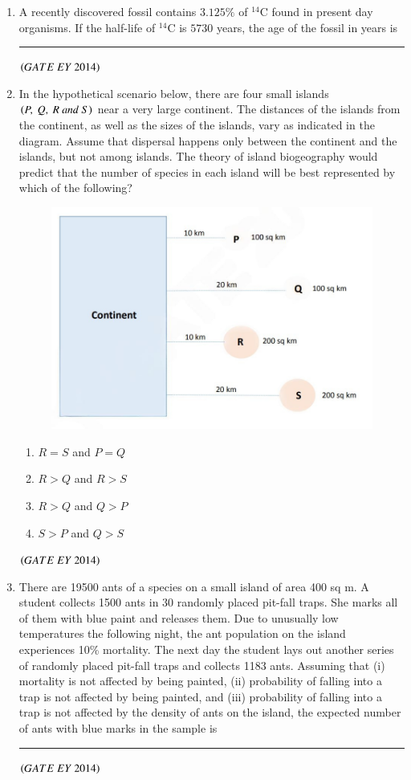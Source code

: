 \documentclass[journal]{IEEEtran}
\numberwithin{equation}{enumi}
\numberwithin{figure}{enumi}
\begin{document}
\begin{enumerate}
    \item A recently discovered fossil contains $3.125\%$ of $^{14}$C found in present day organisms. If the half-life of $^{14}$C is $5730$ years, the age of the fossil in years is \rule{3cm}{0.15mm}
    \hfill{$\brak{ GATE\ EY\ 2014}$}
    \bigskip
    
    \item In the hypothetical scenario below, there are four small islands $\left(P,\ Q,\ R\ and\ S\right)$ near a very large continent. The distances of the islands from the continent, as well as the sizes of the islands, vary as indicated in the diagram. Assume that dispersal happens only between the continent and the islands, but not among islands. The theory of island biogeography would predict that the number of species in each island will be best represented by which of the following?
    \begin{figure}[H]
    \centering
    \includegraphics[width=0.7\columnwidth]{figs/14.png}
    \caption{}
    \label{fig:14}
   \end{figure}
    \begin{multicols}{2}
    \begin{enumerate}
        \item $R = S$ and $P = Q$
        \item $R > Q$ and $R > S$
        \item $R > Q$ and $Q > P$
        \item $S > P$ and $Q > S$
    \end{enumerate}
    \end{multicols}
    \hfill{$\brak{ GATE\ EY\ 2014}$}
    \bigskip
    
    \item There are 19500 ants of a species on a small island of area 400 sq m. A student collects 1500 ants in 30 randomly placed pit-fall traps. She marks all of them with blue paint and releases them. Due to unusually low temperatures the following night, the ant population on the island experiences 10\% mortality. The next day the student lays out another series of randomly placed pit-fall traps and collects 1183 ants. Assuming that (i) mortality is not affected by being painted, (ii) probability of falling into a trap is not affected by being painted, and (iii) probability of falling into a trap is not affected by the density of ants on the island, the expected number of ants with blue marks in the sample is \rule{3cm}{0.15mm}
    \hfill{$\brak{ GATE\ EY\ 2014}$}
    \bigskip
    

\end{enumerate}
\end{document}
